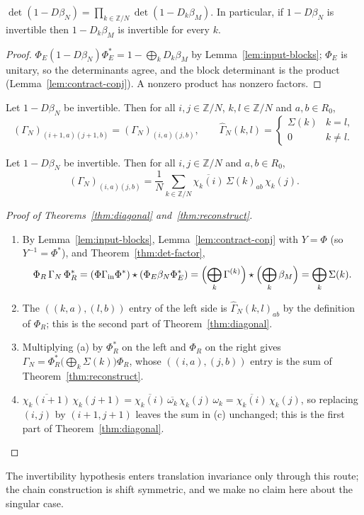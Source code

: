 \begin{theorem}\label{thm:det-factor}
$\det(1-D\beta_N)=\prod_{k\in\mathbb Z/N}\det(1-D_k\beta_M)$. In particular, if
$1-D\beta_N$ is invertible then $1-D_k\beta_M$ is invertible for every $k$.
\end{theorem}
\begin{proof}
$\Phi_E(1-D\beta_N)\Phi_E^*=1-\bigoplus_kD_k\beta_M$ by Lemma~\ref{lem:input-blocks};
$\Phi_E$ is unitary, so the determinants agree, and the block determinant is the product
(Lemma~\ref{lem:contract-conj}). A nonzero product has nonzero factors.
\end{proof}

\begin{theorem}\label{thm:diagonal}
Let $1-D\beta_N$ be invertible. Then for all $i,j\in\mathbb Z/N$, $k,l\in\mathbb Z/N$
and $a,b\in R_0$,
\[
 (\Gamma_N)_{(i+1,a)(j+1,b)}=(\Gamma_N)_{(i,a)(j,b)},
 \qquad
 \widehat{\Gamma}_N(k,l)=\begin{cases}\Sigma(k)&k=l,\\0&k\neq l.\end{cases}
\]
\end{theorem}
\begin{theorem}[Reconstruction]\label{thm:reconstruct}
Let $1-D\beta_N$ be invertible. Then for all $i,j\in\mathbb Z/N$ and $a,b\in R_0$,
\[
 (\Gamma_N)_{(i,a)(j,b)}=\frac1N\sum_{k\in\mathbb Z/N}\overline{\chi_k(i)}\,\Sigma(k)_{ab}\,\chi_k(j).
\]
\end{theorem}
\begin{proof}[Proof of Theorems~\ref{thm:diagonal} and~\ref{thm:reconstruct}]
\begin{enumerate}
\item[(a)] By Lemma~\ref{lem:input-blocks}, Lemma~\ref{lem:contract-conj} with
$Y=\Phi$ (so $Y^{-1}=\Phi^*$), and Theorem~\ref{thm:det-factor},
\[
 \Phi_R\,\Gamma_N\,\Phi_R^*=(\Phi\Gamma_{\mathrm{in}}\Phi^*)\star(\Phi_E\beta_N\Phi_E^*)
 =\Bigl(\bigoplus_k\Gamma^{(k)}\Bigr)\star\Bigl(\bigoplus_k\beta_M\Bigr)=\bigoplus_k\Sigma(k).
\]
\item[(b)] The $((k,a),(l,b))$ entry of the left side is $\widehat{\Gamma}_N(k,l)_{ab}$
by the definition of $\Phi_R$; this is the second part of Theorem~\ref{thm:diagonal}.
\item[(c)] Multiplying (a) by $\Phi_R^*$ on the left and $\Phi_R$ on the right gives
$\Gamma_N=\Phi_R^*\bigl(\bigoplus_k\Sigma(k)\bigr)\Phi_R$, whose $((i,a),(j,b))$ entry is the
sum of Theorem~\ref{thm:reconstruct}.
\item[(d)] $\overline{\chi_k(i+1)}\,\chi_k(j+1)=\overline{\chi_k(i)}\,\overline{\omega_k}\,\chi_k(j)\,\omega_k=\overline{\chi_k(i)}\,\chi_k(j)$,
so replacing $(i,j)$ by $(i+1,j+1)$ leaves the sum in (c) unchanged; this is the first
part of Theorem~\ref{thm:diagonal}. \qedhere
\end{enumerate}
\end{proof}
\begin{remark}\label{rem:singular}
The invertibility hypothesis enters translation invariance only through this route; the
chain construction is shift symmetric, and we make no claim here about the singular case.
\end{remark}

